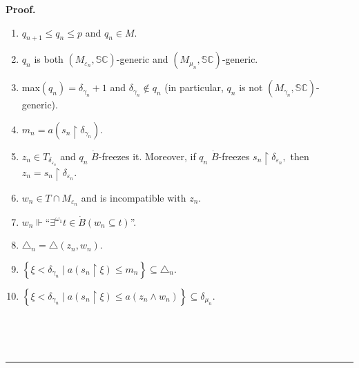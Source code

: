 \documentclass{article}
\newenvironment{proof}[1][Proof]{\noindent\textbf{#1.} }{\ \rule{0.5em}{0.5em}}
\begin{document}
\begin{proof}
\begin{enumerate}
\item $q_{n+1}\leq q_{n}\leq p$ and $q_{n}\in M.$

\item $q_{n}$ is both $(M_{\varepsilon_{n}},\mathbb{SC})$-generic and
$(M_{\mu_{n}},\mathbb{SC})$-generic.

\item \textsf{max}$\left(  q_{n}\right)  =\delta_{\gamma_{n}}+1$ and
$\delta_{\gamma_{n}}\notin q_{n}$ (in particular, $q_{n}$ is not
$(M_{\gamma_{n}},\mathbb{SC})$-generic).

\item $m_{n}=a(s_{n}\upharpoonright\delta_{\gamma_{n}}).$

\item $z_{n}\in T_{\delta_{\varepsilon_{n}}}$ and $q_{n}$ $\dot{B}$-freezes
it. Moreover, if $q_{n}$ $\dot{B}$-freezes $s_{n}\upharpoonright
\delta_{\varepsilon_{n}},$ then $z_{n}=s_{n}\upharpoonright\delta
_{\varepsilon_{n}}.$

\item $w_{n}\in T\cap M_{\varepsilon_{n}}$ and is incompatible with $z_{n}.$

\item $w_{n}\Vdash$\textquotedblleft$\exists^{\omega_{1}}t\in\dot{B}\left(
w_{n}\subseteq t\right)  $\textquotedblright.

\item $\triangle_{n}=\triangle\left(  z_{n},w_{n}\right)  .$

\item $\left\{  \xi<\delta_{\gamma_{n}}\mid a\left(  s_{n}\upharpoonright
\xi\right)  \leq m_{n}\right\}  \subseteq\triangle_{n}.$

\item $\left\{  \xi<\delta_{\gamma_{n}}\mid a\left(  s_{n}\upharpoonright
\xi\right)  \leq a\left(  z_{n}\wedge w_{n}\right)  \right\}  \subseteq
\delta_{\mu_{n}}.$
\end{enumerate}

\qquad\ \qquad\ \qquad\ \qquad\ \qquad\ 


\end{proof}
\end{document}
